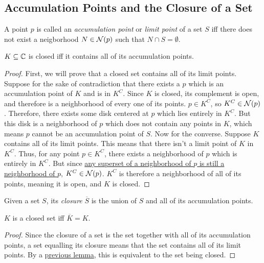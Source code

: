 \subsection{Accumulation Points and the Closure of a Set}
\begin{definition}
A point $p$ is called an \emph{accumulation point} or \emph{limit point} of a set $S$ iff there does not exist a neigborhood $N \in \operatorname{\mathcal{N}}({p})$ such that $N \cap S = \emptyset$.
\end{definition}
\begin{lemma}
$K \subseteq \mathbb{C}$ is closed iff it contains all of its accumulation points.
\end{lemma}
\begin{proof}
First, we will prove that a closed set contains all of its limit points.
Suppose for the sake of contradiction that there exists a $p$ which is an accumulation point of $K$ and is in $K^C$. Since $K$ is closed, its complement is open, and therefore is a neighborhood of every one of its points. $p \in K^C$, so $K^C \in \operatorname{\mathcal{N}}({p})$. Therefore, there exists some disk centered at $p$ which lies entirely in $K^C$. But this disk is a neighborhood of $p$ which does not contain any points in $K$, which means $p$ cannot be an accumulation point of $S$.
Now for the converse. Suppose $K$ contains all of its limit points. This means that there isn't a limit point of $K$ in $K^C$. Thus, for any point $p \in K^C$, there exists a neighborhood of $p$ which is entirely in $K^C$. But since \hyperlink{Supersets of Neighborhoods}{any superset of a neighborhood of $p$ is still a neighborhood of $p$}, $K^C \in \operatorname{\mathcal{N}}({p})$. $K^C$ is therefore a neighborhood of all of its points, meaning it is open, and $K$ is closed.
\end{proof}
\begin{definition}
Given a set $S$, its \emph{closure} $\overline{S}$ is the union of $S$ and all of its accumulation points.
\end{definition}
\begin{lemma}
$K$ is a closed set iff $\overline{K} = K$.
\end{lemma}
\begin{proof}
Since the closure of a set is the set together with all of its accumulation points, a set equalling its closure means that the set contains all of its limit points. By a \hyperlink{Accumulation Points of a Closed Set}{previous lemma}, this is equivalent to the set being closed.
\end{proof}
